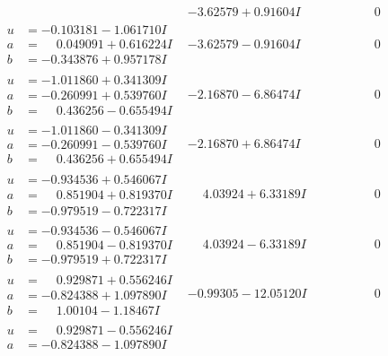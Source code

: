 \documentclass[1p]{elsarticle_modified}
\theoremstyle{definition}
\begin{document}
$$\begin{array}{c|c|c}
 & -3.62579 + 0.91604 I & \phantom{-0.000000 } 0 \\ \hline\begin{aligned}
u &= -0.103181 - 1.061710 I \\
a &= \phantom{-}0.049091 + 0.616224 I \\
b &= -0.343876 + 0.957178 I\end{aligned}
 & -3.62579 - 0.91604 I & \phantom{-0.000000 } 0 \\ \hline\begin{aligned}
u &= -1.011860 + 0.341309 I \\
a &= -0.260991 + 0.539760 I \\
b &= \phantom{-}0.436256 - 0.655494 I\end{aligned}
 & -2.16870 - 6.86474 I & \phantom{-0.000000 } 0 \\ \hline\begin{aligned}
u &= -1.011860 - 0.341309 I \\
a &= -0.260991 - 0.539760 I \\
b &= \phantom{-}0.436256 + 0.655494 I\end{aligned}
 & -2.16870 + 6.86474 I & \phantom{-0.000000 } 0 \\ \hline\begin{aligned}
u &= -0.934536 + 0.546067 I \\
a &= \phantom{-}0.851904 + 0.819370 I \\
b &= -0.979519 - 0.722317 I\end{aligned}
 & \phantom{-}4.03924 + 6.33189 I & \phantom{-0.000000 } 0 \\ \hline\begin{aligned}
u &= -0.934536 - 0.546067 I \\
a &= \phantom{-}0.851904 - 0.819370 I \\
b &= -0.979519 + 0.722317 I\end{aligned}
 & \phantom{-}4.03924 - 6.33189 I & \phantom{-0.000000 } 0 \\ \hline\begin{aligned}
u &= \phantom{-}0.929871 + 0.556246 I \\
a &= -0.824388 + 1.097890 I \\
b &= \phantom{-}1.00104 - 1.18467 I\end{aligned}
 & -0.99305 - 12.05120 I & \phantom{-0.000000 } 0 \\ \hline\begin{aligned}
u &= \phantom{-}0.929871 - 0.556246 I \\
a &= -0.824388 - 1.097890 I \\

\end{aligned}
\end{array}$$
\end{document}
